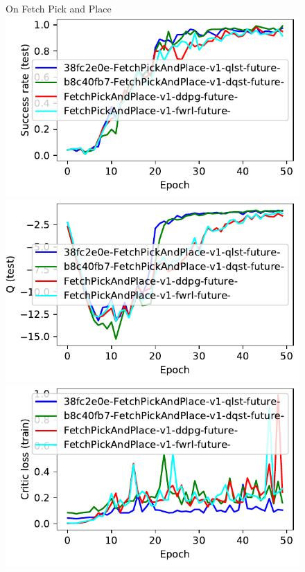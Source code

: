\begin{figure}
  On Fetch Pick and Place\\
  \includegraphics[width=\frac\columnwidth]{media/res/38f4625-FetchPickAndPlace-v1-fwrl-future/test/success_rate.pdf}%
  \includegraphics[width=\frac\columnwidth]{media/res/38f4625-FetchPickAndPlace-v1-fwrl-future/test/mean_Q.pdf}%
  \includegraphics[width=\frac\columnwidth]{media/res/38f4625-FetchPickAndPlace-v1-fwrl-future/train/critic_loss.pdf}%

\end{figure}
